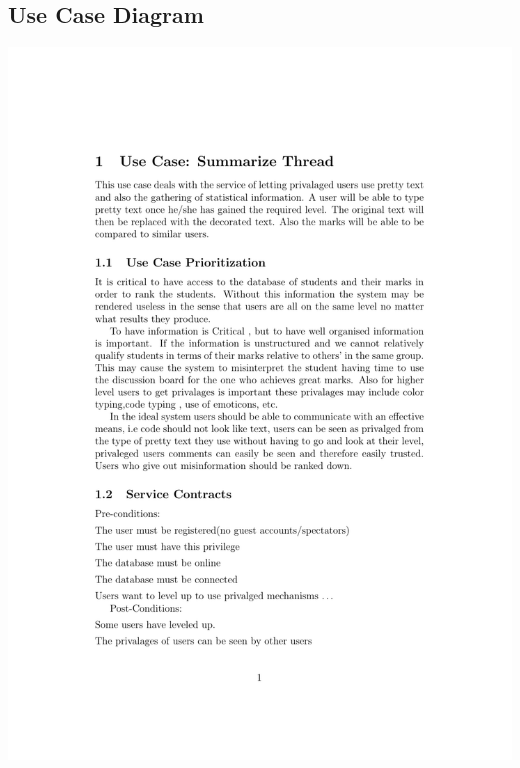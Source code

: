 \documentclass[a4paper,12pt]{article}
\begin{document}
\subsection{Use Case Diagram}
\includegraphics[width=\textwidth]{12260429_SummarizeThread}
\end{document}
